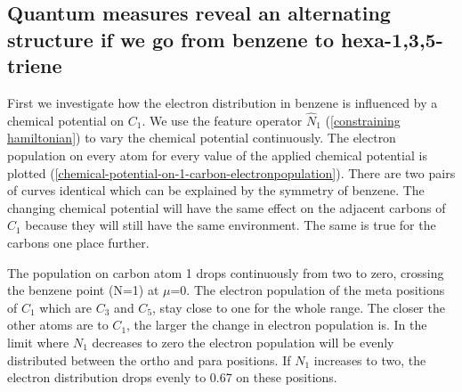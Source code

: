 \documentclass[twoside,twocolumn,9pt]{article}
\begin{document}
    
    
   




\subsection{Quantum measures reveal an alternating structure if we go from benzene to hexa-1,3,5-triene}

  First we investigate how the electron distribution in benzene is influenced by a chemical potential on $C_1$. We use the feature operator $\hat{N}_1$ (\cref{constraining hamiltonian}) to vary the chemical potential continuously. The electron population on every atom for every value of the applied chemical potential is plotted (\cref{chemical-potential-on-1-carbon-electronpopulation}). There are two pairs of curves identical which can be explained by the symmetry of benzene. The changing chemical potential will have the same effect on the adjacent carbons of $C_1$ because they will still have the same environment. The same is true for the carbons one place further. 

  The population on carbon atom 1 drops continuously from two to zero, crossing the benzene point (N=1) at $\mu$=0. The electron population of the meta positions of $C_1$ which are $C_3$ and $C_5$, stay close to one for the whole range. The closer the other atoms are to $C_1$, the larger the change in electron population is.
  In the limit where $N_1$ decreases to zero the electron population will be evenly distributed between the ortho and para positions. If $N_1$ increases to two, the electron distribution drops evenly to 0.67 on these positions.
\end{document}
